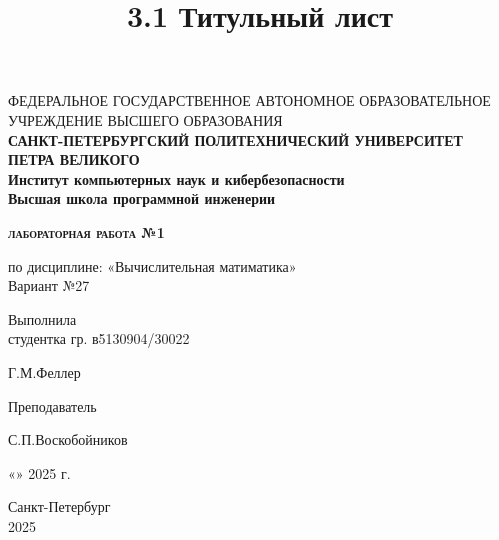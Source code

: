 \documentclass[a4paper,14pt]{article}
\title{3.1 Титульный лист}
\begin{document}
\thispagestyle{empty}    %

\begin{center}
    ФЕДЕРАЛЬНОЕ ГОСУДАРСТВЕННОЕ АВТОНОМНОЕ ОБРАЗОВАТЕЛЬНОЕ УЧРЕЖДЕНИЕ ВЫСШЕГО ОБРАЗОВАНИЯ\\
    \bfseries{САНКТ-ПЕТЕРБУРГСКИЙ ПОЛИТЕХНИЧЕСКИЙ УНИВЕРСИТЕТ ПЕТРА ВЕЛИКОГО}\\
    Институт компьютерных наук и кибербезопасности\\
    Высшая школа программной инженерии
\end{center}

\vspace{20ex} %

\begin{center}
    \begin{huge} {\bfseries{\scshape лабораторная работа №1}} \end{huge}

    \vspace{3ex}
    по дисциплине: «Вычислительная матиматика»\\
    Вариант №27
\end{center}

\vspace{30ex}

\noindent Выполнила\\
студентка гр. в5130904/30022\hfill \begin{minipage}{0.6\textwidth} \hfill Г.М.Феллер\end{minipage}

\vspace{3ex}

\noindent Преподаватель \hfill \begin{minipage} {0.6\textwidth}\hfill С.П.Воскобойников\end{minipage}

\vspace{3ex}

\hfill \begin{minipage}{0.6\textwidth} \hfill «\underline{\hspace{1cm}}»\underline{\hspace{3cm}} 2025 г.\end{minipage}

\vfill

\begin{center}
    Санкт-Петербург\\ 
    2025
\end{center}
\end{document}
